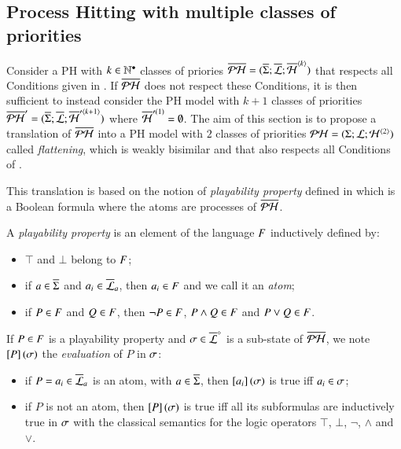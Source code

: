 \subsection{Process Hitting with multiple classes of priorities}
\label{ssec:flattening}


Consider a PH with $k \in \mathbb{N}^\bullet$ classes of priories
$\overline{\mathcal{PH}} = (\overline{\Sigma}; \overline{\mathcal{L}}; \overline{\mathcal{H}}^{{\langle k \rangle}})$
that respects all Conditions given in .
If $\overline{\mathcal{PH}}$ does not respect these Conditions,
it is then sufficient to instead consider the PH model with $k+1$ classes of priorities
$\overline{\mathcal{PH}}' = (\overline{\Sigma}; \overline{\mathcal{L}}; \overline{\mathcal{H}}'^{{\langle k+1 \rangle}})$
where $\overline{\mathcal{H}}'^{(1)} = \emptyset$.
The aim of this section is to propose a translation of $\overline{\mathcal{PH}}$
into a PH model with $2$ classes of priorities $\mathcal{PH} = (\Sigma; \mathcal{L}; \mathcal{H}^{{\langle 2 \rangle}})$
called \emph{flattening},
which is weakly bisimilar
and that also respects all Conditions of .

This translation is based on the notion of \emph{playability property} defined in 
which is a Boolean formula where the atoms are processes of $\overline{\mathcal{PH}}$.

\begin{definition}
  \label{def:pp}
  A \emph{playability property} is an element of the language $F$ inductively defined by:
  \begin{itemize}
    \item $\top$ and $\bot$ belong to $F$;
    \item if $a \in \overline{\Sigma}$ and $a_i \in \overline{\mathcal{L}}_a$, then $a_i \in F$ and we call it an \emph{atom};
    \item if $P \in F$ and $Q \in F$, then $\neg P \in F$, $P \wedge Q \in F$ and $P \vee Q \in F$.
  \end{itemize}
  If $P \in F$ is a playability property and $\sigma \in \overline{\mathcal{L}}^\diamond$ is a sub-state of $\overline{\mathcal{PH}}$,
  we note $\left[P\right](\sigma)$ the \emph{evaluation} of $P$ in $\sigma$:
  \begin{itemize}
    \item if $P = a_i \in \overline{\mathcal{L}}_a$ is an atom, with $a \in \overline{\Sigma}$, then $\left[a_i\right](\sigma)$ is true iff $a_i \in \sigma$;
    \item if $P$ is not an atom, then $\left[P\right](\sigma)$ is true iff all its subformulas are inductively true in $\sigma$
      with the classical semantics for the logic operators $\top$, $\bot$, $\neg$, $\wedge$ and $\vee$.
  \end{itemize}
\end{definition}

